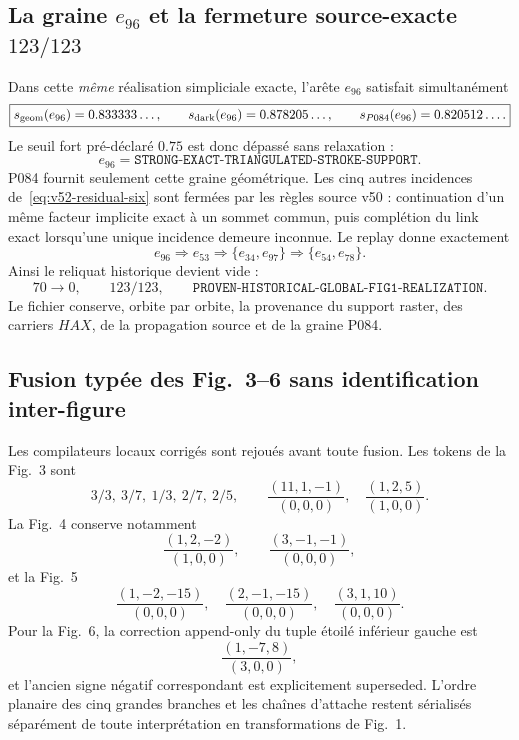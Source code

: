 \subsection{La graine $e_{96}$ et la fermeture source-exacte $123/123$}

Dans cette \emph{même} réalisation simpliciale exacte, l'arête $e_{96}$ satisfait simultanément
\[
 \boxed{
 s_{\rm geom}(e_{96})=0.833333\ldots,
 \qquad
 s_{\rm dark}(e_{96})=0.878205\ldots,
 \qquad
 s_{P084}(e_{96})=0.820512\ldots .}
\]
Le seuil fort pré-déclaré $0.75$ est donc dépassé sans relaxation :
\[
 \boxed{e_{96}=\texttt{STRONG-EXACT-TRIANGULATED-STROKE-SUPPORT}.}
\]
P084 fournit seulement cette graine géométrique. Les cinq autres incidences de~\eqref{eq:v52-residual-six} sont fermées par les règles source v50 : continuation d'un même facteur implicite exact à un sommet commun, puis complétion du link exact lorsqu'une unique incidence demeure inconnue. Le replay donne exactement
\begin{equation}\label{eq:v52-final-propagation}
 \boxed{
 e_{96}\Longrightarrow e_{53}
 \Longrightarrow\{e_{34},e_{97}\}
 \Longrightarrow\{e_{54},e_{78}\}.}
\end{equation}
Ainsi le reliquat historique devient vide :
\begin{equation}\label{eq:v52-123}
 \boxed{70\to0,\qquad123/123,\qquad
 \texttt{PROVEN-HISTORICAL-GLOBAL-FIG1-REALIZATION}.}
\end{equation}
Le fichier  conserve, orbite par orbite, la provenance du support raster, des carriers $HAX$, de la propagation source et de la graine P084.

\subsection{Fusion typée des Fig.~3--6 sans identification inter-figure}

Les compilateurs locaux corrigés sont rejoués avant toute fusion. Les tokens de la Fig.~3 sont
\[
 3/3,\ 3/7,\ 1/3,\ 2/7,\ 2/5,
 \qquad
 \frac{(11,1,-1)}{(0,0,0)},\quad
 \frac{(1,2,5)}{(1,0,0)}.
\]
La Fig.~4 conserve notamment
\[
 \frac{(1,2,-2)}{(1,0,0)},\qquad
 \frac{(3,-1,-1)}{(0,0,0)},
\]
et la Fig.~5
\[
 \frac{(1,-2,-15)}{(0,0,0)},\quad
 \frac{(2,-1,-15)}{(0,0,0)},\quad
 \frac{(3,1,10)}{(0,0,0)}.
\]
Pour la Fig.~6, la correction append-only du tuple étoilé inférieur gauche est
\begin{equation}\label{eq:v52-fig6-correction}
 \boxed{\frac{(1,-7,8)}{(3,0,0)}},
\end{equation}
et l'ancien signe négatif correspondant est explicitement superseded. L'ordre planaire des cinq grandes branches et les chaînes d'attache restent sérialisés séparément de toute interprétation en transformations de Fig.~1.

